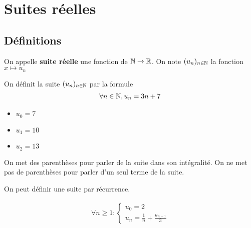 \chapter{Suites réelles}
\section{Définitions}

\begin{graybox}
    \begin{definition}
\par On appelle \textbf{suite réelle} une fonction de $\mathbb{N} \to \mathbb{R}$. On note $(u_n)_{n \in \mathbb{N}}$ la fonction $x \mapsto u_n$
\end{definition}
\end{graybox}

\begin{exemple}
\par On définit la suite $(u_n)_{n \in \mathbb{N}}$ par la formule 
\begin{align*}
    \forall n \in \mathbb{N}, u_n = 3n + 7
\end{align*}

\begin{itemize}
    \item $u_0 = 7$
    \item $u_1 = 10$
    \item $u_2 = 13$
\end{itemize}
\end{exemple}

\begin{remarque}
\par On met des parenthèses pour parler de la suite dans son intégralité. On ne met pas de parenthèses pour parler d'un seul terme de la suite.
\end{remarque}

\begin{remarque}
    \par On peut définir une suite par récurrence.
\end{remarque}

\begin{exemple}
    \begin{align*}
        \forall n \geqslant 1 :
        \begin{cases}
        u_0 = 2 \\
        u_n = \frac{1}{n} + \frac{u_{n - 1}}{3}
        \end{cases}
    \end{align*}
\end{exemple}

